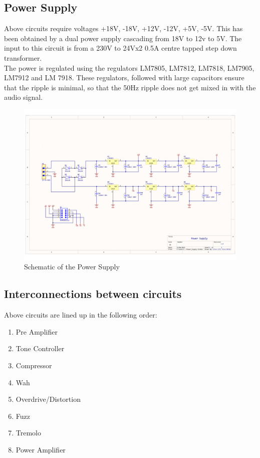 \documentclass{article}
\begin{document}
            \subsection{Power Supply}
            Above circuits require voltages +18V, -18V, +12V, -12V, +5V, -5V. This has been obtained by a dual power supply cascading from 18V to 12v to 5V. The input to this circuit is from a 230V to 24Vx2 0.5A centre tapped step down transformer.\\
            The power is regulated using the regulators LM7805, LM7812, LM7818, LM7905, LM7912 and LM 7918. These regulators, followed with large capacitors ensure that the ripple is minimal, so that the 50Hz ripple does not get mixed in with the audio signal.
                \begin{figure}[h!]
                    \centering
                    \includegraphics[scale=0.4]{ps-1.png}
                    \caption{Schematic of the Power Supply}
                    \label{fig:enter-label}
                \end{figure}
                
            \subsection{Interconnections between circuits}
                Above circuits are lined up in the following order:
                \begin{enumerate}
                    \item Pre Amplifier
                    \item Tone Controller
                    \item Compressor
                    \item Wah
                    \item Overdrive/Distortion
                    \item Fuzz
                    \item Tremolo
                    \item Power Amplifier
                \end{enumerate}
\end{document}
